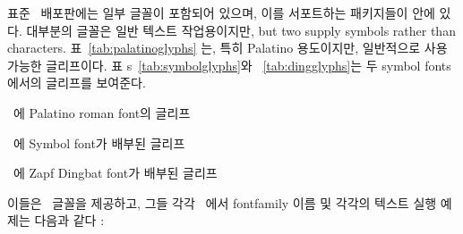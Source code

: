표준 \ltx\ 배포판에는 일부 \pscript{} 글꼴이 포함되어 있으며, 이를 서포트하는 패키지들이  안에 있다.
대부분의 글꼴은 일반 텍스트 작업용이지만, but two supply symbols rather than characters.
표~\ref{tab:palatinoglyphs} 는, 특히 Palatino 용도이지만, 일반적으로 사용 가능한 글리프이다.
표 s~\ref{tab:symbolglyphs}와 ~\ref{tab:dingglyphs}는 두 symbol fonts에서의 글리프를 보여준다.

\begin{table}
\centering
\caption{\ltx\ 에 Palatino roman font의 글리프 }\label{tab:palatinoglyphs}
\nohexoct
{}
\end{table}

\begin{table}
\centering
\caption{\ltx\ 에 Symbol font가 배부된 글리프 }\label{tab:symbolglyphs}
\nohexoct
{}
\end{table}

\begin{table}
\centering
\caption{\ltx\ 에 Zapf Dingbat font가 배부된 글리프 }\label{tab:dingglyphs}
\nohexoct
{}
\end{table}


이들은 \pscript\ 글꼴을 제공하고, 그들 각각 \ltx\ 에서 fontfamily 이름 및 각각의 텍스트 실행 예제는 다음과 같다 : 

